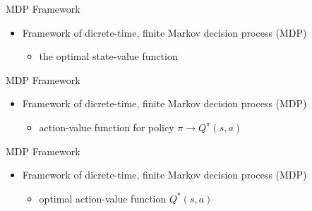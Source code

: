 \begin{frame}{MDP Framework}
    \begin{itemize}
        \item Framework of dicrete-time, finite Markov decision process (MDP)
        \begin{itemize}
            \item the optimal state-value function\end{itemize}
    \end{itemize}
\end{frame}

\begin{frame}{MDP Framework}
    \begin{itemize}
        \item Framework of dicrete-time, finite Markov decision process (MDP)
        \begin{itemize}
            \item action-value function for policy $\pi \rightarrow Q^\pi (s,a)$\end{itemize}
    \end{itemize}
\end{frame}

\begin{frame}{MDP Framework}
    \begin{itemize}
        \item Framework of dicrete-time, finite Markov decision process (MDP)
        \begin{itemize}
            \item optimal action-value function $Q^* (s,a)$\end{itemize}
    \end{itemize}
\end{frame}


